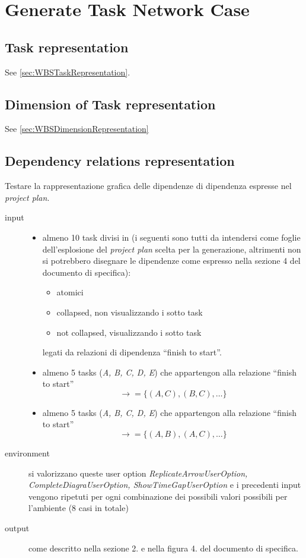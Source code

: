\chapter{Generate Task Network Case}
\label{chap:generateTaskNetwork}

\section{Task representation}
See \ref{sec:WBSTaskRepresentation}.

\section{Dimension of Task representation}
See \ref{sec:WBSDimensionRepresentation}

\section{Dependency relations representation}
\label{sec:TNDependencyrepresentation}
Testare la rappresentazione grafica delle dipendenze di dipendenza espresse
nel \emph{project plan}.
\begin{description}
\item[input]  \quad
\begin{itemize}
  \item almeno 10 task divisi in (i seguenti sono tutti da intendersi come
  foglie dell'esplosione del \emph{project plan} scelta per la generazione,
  altrimenti non si potrebbero disegnare le dipendenze come espresso nella
  sezione 4 del documento di specifica):
  \begin{itemize}
  \item atomici
  \item collapsed, non visualizzando i sotto task
  \item not collapsed, visualizzando i sotto task 
  \end{itemize} legati da relazioni di dipendenza ``finish to start''.
  \item almeno 5 tasks (\emph{A, B, C, D, E}) che appartengon alla
relazione ``finish to start'' $$\rightarrow = \lbrace (A, C), (B, C), \ldots
\rbrace$$   
  \item almeno 5 tasks (\emph{A, B, C, D, E}) che appartengon alla
relazione ``finish to start'' $$\rightarrow = \lbrace (A, B), (A, C), \ldots
\rbrace$$
\end{itemize}
\item[environment] si valorizzano queste user option
\emph{ReplicateArrowUserOption, \\CompleteDiagraUserOption,
ShowTimeGapUserOption} e i precedenti input vengono ripetuti per ogni
combinazione dei possibili valori possibili per l'ambiente (8 casi in totale)
\item[output] come descritto nella sezione 2. e nella figura 4. del
documento di specifica.
\end{description}

